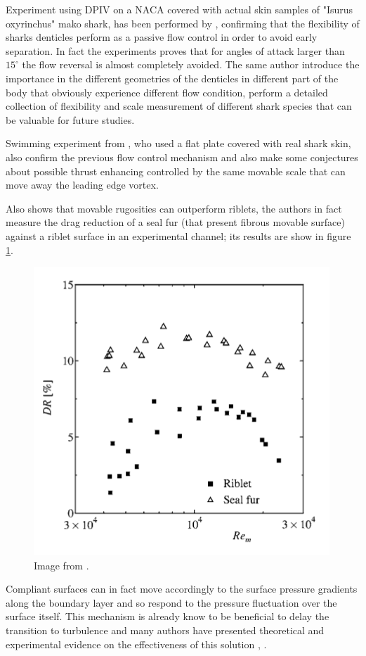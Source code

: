 Experiment using DPIV on a NACA covered with actual skin samples of "Isurus oxyrinchus" mako shark, has been performed by \citet{lang2014SharkControl}, confirming that the flexibility of sharks denticles perform as a passive flow control in order to avoid early separation.
In fact the experiments proves that for angles of attack larger than $15^{\circ}$ the flow reversal is almost completely avoided.
The same author introduce the importance in the different geometries of the denticles in different part of the body that obviously experience different flow condition,
\citet{motta2012Shark} perform a detailed collection of flexibility and scale measurement of different shark species that can be valuable for future studies.

Swimming experiment from \cite{Oeffner785}, who used a flat plate covered with real shark skin, also confirm the previous flow control mechanism and also make some conjectures about possible thrust enhancing controlled by the same movable scale that can move away the leading edge vortex.

Also \citet{itoh2006turbulent} shows that movable rugosities can outperform riblets, the authors in fact measure the drag reduction of a seal fur (that present fibrous movable surface) against a riblet surface in an experimental channel; its results are show in figure \ref{fig:seal}.

\begin{figure}[h]
\centering
\includegraphics[width=0.7\linewidth]{chapter_1/seal}
\caption{Image from \citet{itoh2006turbulent}.}
\label{fig:seal}
\end{figure}


Compliant surfaces can in fact move accordingly to the surface pressure gradients along the boundary layer and so respond to the pressure fluctuation over the surface itself.
This mechanism is already know to be beneficial to delay the transition to turbulence and many authors have presented theoretical and experimental evidence on the effectiveness of this solution \cite{carpenter1990status}, \cite{bushnell1977effect}.

